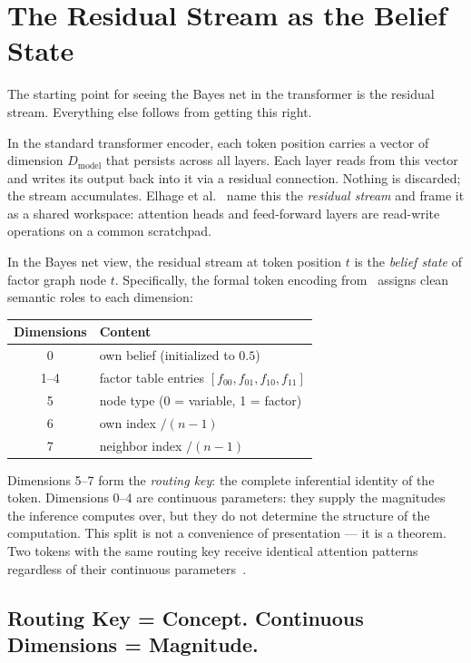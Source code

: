 \section{The Residual Stream as the Belief State}
\label{sec:residual-stream}

The starting point for seeing the Bayes net in the transformer is the residual
stream. Everything else follows from getting this right.

In the standard transformer encoder, each token position carries a vector of
dimension $D_{\mathrm{model}}$ that persists across all layers. Each layer reads
from this vector and writes its output back into it via a residual connection.
Nothing is discarded; the stream accumulates. Elhage et al.~\cite{elhage2021mathematical}
name this the \emph{residual stream} and frame it as a shared workspace: attention
heads and feed-forward layers are read-write operations on a common scratchpad.

In the Bayes net view, the residual stream at token position $t$ is the
\emph{belief state} of factor graph node $t$. Specifically, the formal token
encoding from~\cite{coppola2026transformers} assigns clean semantic roles to each
dimension:

\begin{center}
\begin{tabular}{cl}
\toprule
Dimensions & Content \\
\midrule
0 & own belief (initialized to $0.5$) \\
1--4 & factor table entries $[f_{00}, f_{01}, f_{10}, f_{11}]$ \\
5 & node type (0 = variable, 1 = factor) \\
6 & own index $/ (n-1)$ \\
7 & neighbor index $/ (n-1)$ \\
\bottomrule
\end{tabular}
\end{center}

Dimensions 5--7 form the \emph{routing key}: the complete inferential identity of
the token. Dimensions 0--4 are continuous parameters: they supply the magnitudes
the inference computes over, but they do not determine the structure of the
computation. This split is not a convenience of presentation --- it is a theorem.
Two tokens with the same routing key receive identical attention patterns
regardless of their continuous parameters~\cite{coppola2026transformers}.

\subsection*{Routing Key = Concept. Continuous Dimensions = Magnitude.}

